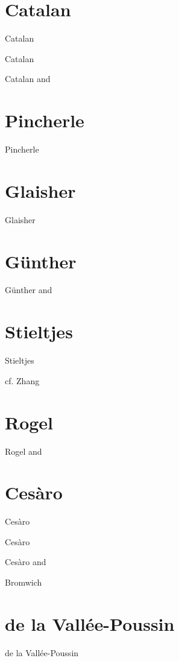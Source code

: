 \documentclass{amsart}
\begin{document}
\section{Catalan}
Catalan \cite{catalan1842}

Catalan \cite[p.~89]{catalan1873}

Catalan \cite[p.~119, \S CXXIV]{melanges1886} and \cite[pp.~38--39, \S CCXXVI]{melanges1888}




\section{Pincherle}
Pincherle \cite{pincherle}







\section{Glaisher}
Glaisher \cite[p.~163]{glaisher}

\section{G\"unther}
G\"unther \cite[p.~83]{gunther} and \cite[p.~178]{gunther1881}

\section{Stieltjes}
Stieltjes \cite{stieltjes}

cf. Zhang \cite{zhang}

\section{Rogel}
Rogel \cite{rogel} and \cite{rogel1891}


\section{Ces\`aro}
Ces\`aro \cite{cesaro1886}

Ces\`aro \cite{cesaro1888}




Ces\`aro \cite{cesaro1893} and \cite[pp.~181--184]{cesaro1894}



Bromwich \cite[p.~201, Chapter VIII, Example B, 35]{bromwich}


\section{de la Vall\'ee-Poussin}
de la Vall\'ee-Poussin \cite{valleepoussin}
\end{document}
